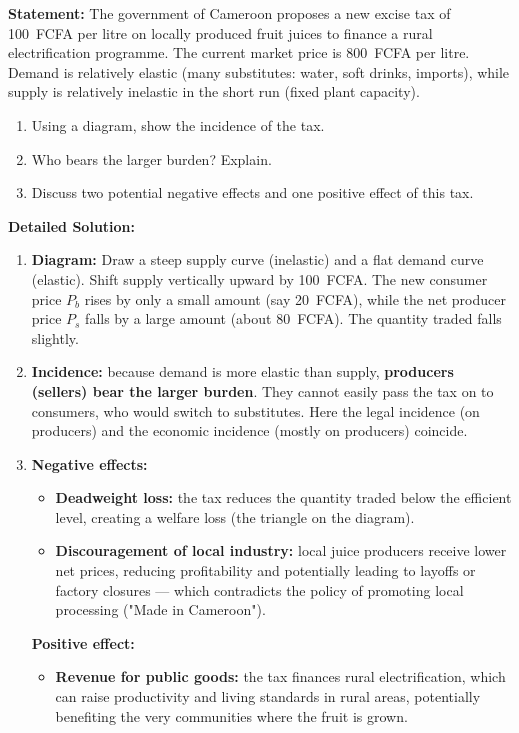 \documentclass[11pt]{article}
\begin{document}
\begin{exoresolu}
\textbf{Statement:} The government of Cameroon proposes a new excise tax of \SI{100}{FCFA} per litre on locally produced fruit juices to finance a rural electrification programme. The current market price is \SI{800}{FCFA} per litre. Demand is relatively elastic (many substitutes: water, soft drinks, imports), while supply is relatively inelastic in the short run (fixed plant capacity).
\begin{enumerate}
    \item Using a diagram, show the incidence of the tax.
    \item Who bears the larger burden? Explain.
    \item Discuss two potential negative effects and one positive effect of this tax.
\end{enumerate}
\tcblower
\textbf{Detailed Solution:}
\begin{enumerate}
    \item \textbf{Diagram:} Draw a steep supply curve (inelastic) and a flat demand curve (elastic). Shift supply vertically upward by \SI{100}{FCFA}. The new consumer price \(P_b\) rises by only a small amount (say \SI{20}{FCFA}), while the net producer price \(P_s\) falls by a large amount (about \SI{80}{FCFA}). The quantity traded falls slightly.
    \item \textbf{Incidence:} because demand is more elastic than supply, \textbf{producers (sellers) bear the larger burden}. They cannot easily pass the tax on to consumers, who would switch to substitutes. Here the legal incidence (on producers) and the economic incidence (mostly on producers) coincide.
    \item \textbf{Negative effects:}
        \begin{itemize}
            \item \textbf{Deadweight loss:} the tax reduces the quantity traded below the efficient level, creating a welfare loss (the triangle on the diagram).
            \item \textbf{Discouragement of local industry:} local juice producers receive lower net prices, reducing profitability and potentially leading to layoffs or factory closures — which contradicts the policy of promoting local processing ("Made in Cameroon").
        \end{itemize}
        \textbf{Positive effect:}
        \begin{itemize}
            \item \textbf{Revenue for public goods:} the tax finances rural electrification, which can raise productivity and living standards in rural areas, potentially benefiting the very communities where the fruit is grown.
        \end{itemize}
\end{enumerate}
\end{exoresolu}
\end{document}
